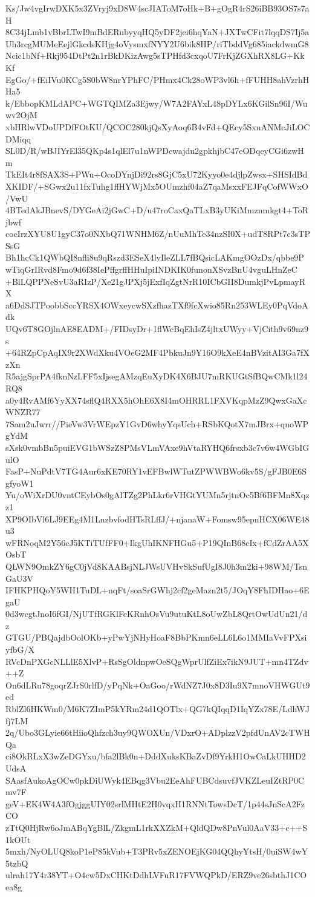 Ks/Jw4vgIrwDXK5x3ZVryj9xD8W4scJIAToM7oHk+B+gOgR4rS26iBB93OS7s7aH
8C34jLmb1vBbrLTwI9mBdERubyyqHQ5yDF2jei6hqYaN+JXTwCFit7lqqDS7Ij5a
Uh3rcgMUMeEejlGkcdsKHjg4oVysmxfNYY2U6bik8HP/riTbddVg685iackdwmG8
Ncic1bNf+Rkj954DtPt2n1rBkDKizAwg5sTPHfd3cxqoU7FrKjZGXhRX8LG+KkKf
EgGo/+fEiIVu0KCg5S0bW8nrYPhFC/PHmx4Ck28oWP3vl6h+fFUHH8ahVzrhHHa5
k/EbbopKMLdAPC+WGTQIMZa3Ejwy/W7A2FAYxL48pDYLx6KGilSn96I/Wuwv2OjM
xbHRlwVDoUPDfFOtKU/QCOC280kjQsXyAoq6B4vFd+QEcy5SxnANMcJiLOCDMiqq
SL0D/R/wBJIYrEl35QKp4s1qlEl7u1nWPDcwajdu2gpkhjbC47eODqeyCGi6zwHm
TkEIt4r8fSAX3S+PWu+OcoDYnjDi92rs8GjC5xU72Kyyo0e4djlpZwsx+SHSIdBd
XKIDF/+SGwx2u11fxTuhg1ffHYWjMx5OUmzhf04aZ7qaMsxxFEJFqCofWWxO/VwU
4BTedAkJBnevS/DYGeAi2jGwC+D/u47roCaxQaTLxB3yUKiMmznmkgt4+ToRjbwf
cocIrzXYU8U1gyC37o0NXbQ71WNHM6Z/nUuMhTe34nzSI0X+udT8RPt7c3sTPSsG
Bh1hcCk1QWbQI8nfli8u9qRszd3ESeX4lvIleZLL7fBQsicLAKmgOOzDx/qbbe9P
wTiqGrIRvd8Fmo9d6f38IePffgrffHHuIpiINDKIK0funonXSvzBnU4vguLHnZeC
+BlLQPPNeSvU3aRIzP/Xe21gJPXj5jExfIqZgtNrR10ICbGII8DumkjPvLpmayRX
a6DdSJTPoobbSccYRSX4OWxeycwSXzfhazTXf9fcXwio85Rn253WLEy0PqVdoAdk
UQv6T8GOjlnAE8EADM+/FIDsyDr+1flWcBqEhIsZ4jltxUWyy+VjCith9v69nz9s
+64RZpCpAqIX9r2XWdXku4VOeG2MF4PbkuJn9Y16O9kXeE4nBVzitAI3Ga7fXzXn
R5ajgSprPA4fknNzLFF5xIjsegAMzqEuXyDK4X6BJU7mRKUGtSfBQwCMk1l24RQ8
a0y4RvAMf6YyXX74sflQ4RXX5hOhE6X8I4mOHRRL1FXVKqpMzZ9QwxGaXcWNZR77
7Sam2uJwrr//PieVw3VrWEpzY1GvD6whyYqsUch+RSbKQotX7mJBrx+qnoWPgYdM
sXsk0vmbBn5puiEVG1bWSzZ8PMsVLmVAxe9hVtaRYHQ6frsxb3c7v6w4WGbIGulO
FasP+NuPdtV7TG4Aur6xKE70RY1vEFBwlWTutZPWWBWo6kv5S/gFJB0E6SgfyoW1
Yu/oWiXrDU0vntCEybOs0gAlTZg2PhLkr6rVHGtYUMn5rjtnOc5Bf6BFMn8Xqzz1
XP9OIbVl6LJ9EEg4M1LnzbvfodHTsRLffJ/+njanaW+Fomsw95epnHCX06WE48u3
wFRNoqM2Y56cJ5KTiTUfFF0+IkgUhIKNFHGu5+P19QInB68cIx+fCdZrAA5XOsbT
QLWN9OmkZY6gC0jVd8KAABsjNLJWsUVHvSkSufUgI8J0h3m2ki+98WM/TsnGaU3V
IFHKPHQoY5WH1TuDL+nqFt/soaSrGWhj2cf2geMazn2t5/JOqY8FhIDHao+6EgaU
0d3wcgtJnoI6fGI/NjUTfRGKlFcKRnhOsVu9utuKtL8oUwZbL8QrtOwUdUn21/dz
GTGU/PBQajdbOolOKb+yPwYjNHyHoaF8BbPKmn6eLL6L6o1MMIaVvFPXsiyfbG/X
RVcDnPXGcNLLlE5XlvP+RsSgOldnpwOeSQgWprUlfZiEx7ikN9JUT+mn4TZdv++Z
On6dLRu78goqrZJrS0rlfD/yPqNk+OaGoo/rWdNZ7J0x8D3Iu9X7mnoVHWGUt9ed
RblZl6HKWm0/M6K7ZImP5kYRm24d1QOTlx+QG7kQIqqD1IqYZx78E/LdhWJfj7LM
2q/Ubo3GLyie66tHiioQhfzch3uy9QWOXUn/VDxrO+ADplzzV2pfdUnAV2cTWHQa
ci8OkRLxX3wZeDGYxu/bfa2lBk0n+DddXuksKBaZvDf9YrkH1OwCaLkUHHD2UdsA
SAasfAukoAgOCw0pkDiUWyk4EBqg3Vbu2EeAhFUBCdsuvfJVKZLeuIZtRP0Cmv7F
geV+EK4W4A3fOgjggUIY02srlMHtE2H0vqxH1RNNtTowsDcT/1p44sJnScA2FzCO
zTtQ0HjRw6oJmABqYgBlL/ZkgmL1rkXXZkM+QldQDw8PnVul0AaV33+c++S1kOUt
5mxh/NyOLUQ8koP1eP85kVub+T3PRv5xZENOEjKG04QQhyYtsH/0uiSW4wY5tzbQ
ulrah17Y4r38YT+O4cw5DxCHKtDdhLVFuR17FVWQPkD/ERZ9ve26sbthJ1COea8g
